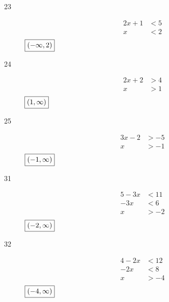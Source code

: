 \documentclass[letterpaper]{exam}
\begin{document}
\begin{description}
      \item[23] 
        \begin{align*}
          2x + 1 & < 5 \\
          x      & < 2 \\
        \end{align*}
        $\boxed{ \intoo{ -\infty, 2 } }$

      \newpage

      \item[24] 
        \begin{align*}
          2x + 2 & > 4 \\
          x      & > 1 \\
        \end{align*}
        $\boxed{ \intoo{ 1, \infty } }$

      \item[25] 
        \begin{align*}
          3x - 2 & > -5 \\
          x      & > -1 \\
        \end{align*}
        $\boxed{ \intoo{ -1, \infty } }$


      \item[31]
        \begin{align*}
          5 - 3x & < 11 \\
          -3x    & < 6 \\
          x      & > -2 \\
        \end{align*}
        $\boxed{ \intoo{ -2, \infty } }$

      \item[32]
        \begin{align*}
          4 - 2x & < 12 \\
          -2x    & < 8 \\
          x      & > -4 \\
        \end{align*}
        $\boxed{ \intoo{ -4, \infty } }$ 


\end{description}
\end{document}
